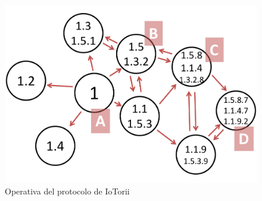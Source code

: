 \\
\begin{figure}[ht!]
    \centering
    \includegraphics[width=\textwidth]{archivos/img/analisis/iotorii-operation.pdf}
    \caption{Operativa del protocolo de IoTorii \cite{rojas2021outperforming}}
    \label{fig:iotorii-operation}
\end{figure}

